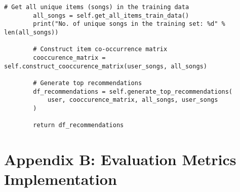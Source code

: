 \documentclass[12pt,a4paper]{article}
\begin{document}
\begin{lstlisting}[caption=Complete Item-Based Collaborative Filtering Implementation]
        # Get all unique items (songs) in the training data
        all_songs = self.get_all_items_train_data()
        print("No. of unique songs in the training set: %d" % len(all_songs))

        # Construct item co-occurrence matrix
        cooccurence_matrix = self.construct_cooccurence_matrix(user_songs, all_songs)
        
        # Generate top recommendations
        df_recommendations = self.generate_top_recommendations(
            user, cooccurence_matrix, all_songs, user_songs
        )

        return df_recommendations
\end{lstlisting}

\section{Appendix B: Evaluation Metrics Implementation}
\end{document}
